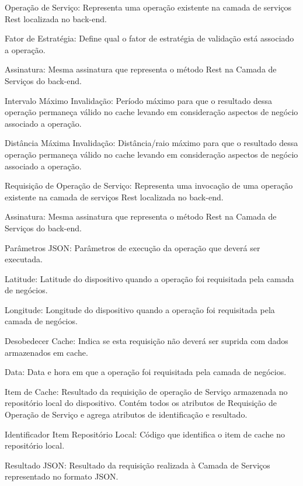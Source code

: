 \documentclass[
	article,			%
	11pt,				%
	oneside,			%
	a4paper,			%
	english,			%
	brazil,				%
	sumario=tradicional
]{abntex2}
\begin{document}
\begin{description}
	\item Operação de Serviço:
	Representa uma operação existente na camada de serviços Rest localizada no \gls{back-end}.
	\begin{description}
		\item Fator de Estratégia: Define qual o fator de estratégia de validação está associado a operação.
		\item Assinatura: Mesma assinatura que representa o método Rest na Camada de Serviços do \gls{back-end}.
		\item Intervalo Máximo Invalidação: Período máximo para que o resultado dessa operação permaneça válido no cache levando em consideração aspectos de negócio associado a operação.
		\item Distância Máxima Invalidação: Distância/raio máximo para que o resultado dessa operação permaneça válido no cache levando em consideração aspectos de negócio associado a operação.
	\end{description}
	\item Requisição de Operação de Serviço:
	Representa uma invocação de uma operação existente na camada de serviços Rest localizada no \gls{back-end}.
	\begin{description}
		\item Assinatura: Mesma assinatura que representa o método Rest na Camada de Serviços do \gls{back-end}.
		\item Parâmetros JSON: Parâmetros de execução da operação que deverá ser executada.
		\item Latitude: Latitude do dispositivo quando a operação foi requisitada pela camada de negócios.
		\item Longitude: Longitude do dispositivo  quando a operação foi requisitada pela camada de negócios.
		\item Desobedecer Cache: Indica se esta requisição não deverá ser suprida com dados armazenados em cache.
		\item Data: Data e hora em que a operação foi requisitada pela camada de negócios.
	\end{description}
	\item Item de Cache:
	Resultado da requisição de operação de Serviço armazenada no repositório local do dispositivo. Contém todos os atributos de Requisição de Operação de Serviço e agrega atributos de identificação e resultado.
	\begin{description}
		\item Identificador Item Repositório Local: Código que identifica o item de cache no repositório local.
		\item Resultado JSON: Resultado da requisição realizada à Camada de Serviços representado no formato JSON.
	\end{description}
\end{description}
\end{document}
